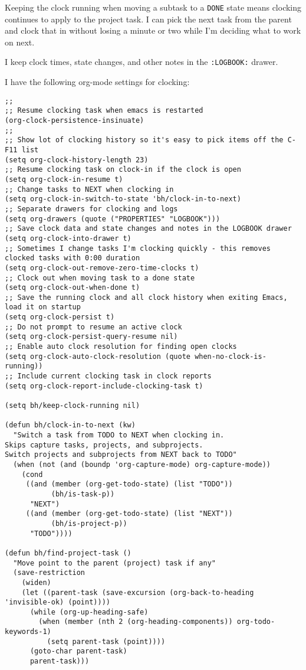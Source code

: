 \documentclass[11pt]{scrartcl}
\begin{document}
Keeping the clock running when moving a subtask to a \texttt{DONE} state
means clocking continues to apply to the project task.  I can pick the
next task from the parent and clock that in without losing a minute or
two while I'm deciding what to work on next.

I keep clock times, state changes, and other notes in the \texttt{:LOGBOOK:}
drawer.

I have the following org-mode settings for clocking:

\begin{verbatim}
;;
;; Resume clocking task when emacs is restarted
(org-clock-persistence-insinuate)
;;
;; Show lot of clocking history so it's easy to pick items off the C-F11 list
(setq org-clock-history-length 23)
;; Resume clocking task on clock-in if the clock is open
(setq org-clock-in-resume t)
;; Change tasks to NEXT when clocking in
(setq org-clock-in-switch-to-state 'bh/clock-in-to-next)
;; Separate drawers for clocking and logs
(setq org-drawers (quote ("PROPERTIES" "LOGBOOK")))
;; Save clock data and state changes and notes in the LOGBOOK drawer
(setq org-clock-into-drawer t)
;; Sometimes I change tasks I'm clocking quickly - this removes clocked tasks with 0:00 duration
(setq org-clock-out-remove-zero-time-clocks t)
;; Clock out when moving task to a done state
(setq org-clock-out-when-done t)
;; Save the running clock and all clock history when exiting Emacs, load it on startup
(setq org-clock-persist t)
;; Do not prompt to resume an active clock
(setq org-clock-persist-query-resume nil)
;; Enable auto clock resolution for finding open clocks
(setq org-clock-auto-clock-resolution (quote when-no-clock-is-running))
;; Include current clocking task in clock reports
(setq org-clock-report-include-clocking-task t)

(setq bh/keep-clock-running nil)

(defun bh/clock-in-to-next (kw)
  "Switch a task from TODO to NEXT when clocking in.
Skips capture tasks, projects, and subprojects.
Switch projects and subprojects from NEXT back to TODO"
  (when (not (and (boundp 'org-capture-mode) org-capture-mode))
    (cond
     ((and (member (org-get-todo-state) (list "TODO"))
           (bh/is-task-p))
      "NEXT")
     ((and (member (org-get-todo-state) (list "NEXT"))
           (bh/is-project-p))
      "TODO"))))

(defun bh/find-project-task ()
  "Move point to the parent (project) task if any"
  (save-restriction
    (widen)
    (let ((parent-task (save-excursion (org-back-to-heading 'invisible-ok) (point))))
      (while (org-up-heading-safe)
        (when (member (nth 2 (org-heading-components)) org-todo-keywords-1)
          (setq parent-task (point))))
      (goto-char parent-task)
      parent-task)))


\end{verbatim}
\end{document}
